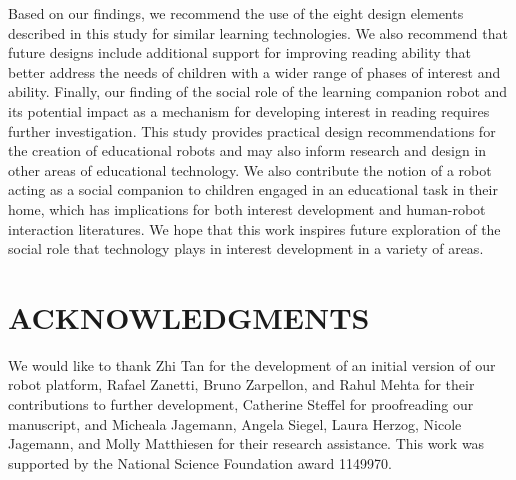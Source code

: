 \documentclass{sigchi}
\begin{document}
Based on our findings, we recommend the use of the eight design elements described in this study for similar learning technologies. We also recommend that future designs include additional support for improving reading ability that better address the needs of children with a wider range of phases of interest and ability. Finally, our finding of the social role of the learning companion robot and its potential impact as a mechanism for developing interest in reading requires further investigation. This study provides practical design recommendations for the creation of educational robots and may also inform research and design in other areas of educational technology. We also contribute the notion of a robot acting as a social companion to children engaged in an educational task in their home, which has implications for both interest development and human-robot interaction literatures. We hope that this work inspires future exploration of the social role that technology plays in interest development in a variety of areas.

\section{ACKNOWLEDGMENTS}
We would like to thank Zhi Tan for the development of an initial version of our robot platform, Rafael Zanetti, Bruno Zarpellon, and Rahul Mehta for their contributions to further development, Catherine Steffel for proofreading our manuscript, and Micheala Jagemann, Angela Siegel, Laura Herzog, Nicole Jagemann, and Molly Matthiesen for their research assistance. This work was supported by the National Science Foundation award 1149970.


\balance{}



\end{document}
